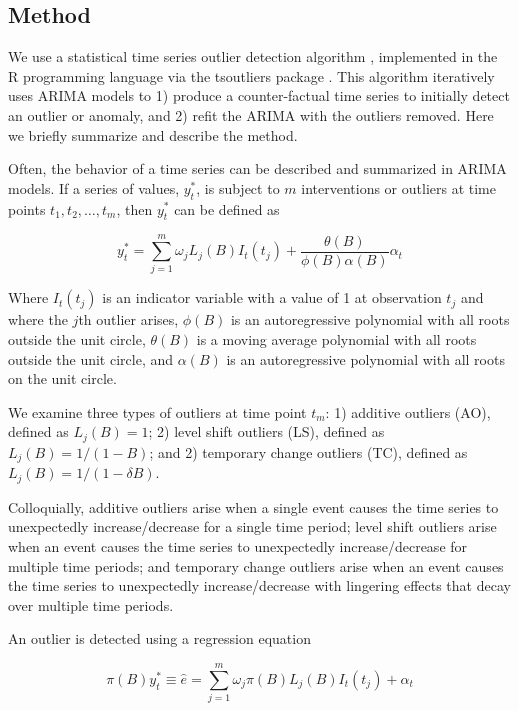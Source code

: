 \documentclass[12pt]{article}
\begin{document}
\hypertarget{method}{%
\subsection{Method}\label{method}}

We use a statistical time series outlier detection algorithm
\citep{chen1993joint}, implemented in the R programming language
\citep{rcore} via the tsoutliers package \citep{tsoutliers2019}. This
algorithm iteratively uses ARIMA models to 1) produce a counter-factual
time series to initially detect an outlier or anomaly, and 2) refit the
ARIMA with the outliers removed. Here we briefly summarize and describe
the method.

Often, the behavior of a time series can be described and summarized in
ARIMA models. If a series of values, \(y_t^*\), is subject to \(m\)
interventions or outliers at time points \(t_1,t_2,…,t_m\), then
\(y_t^*\) can be defined as

\[y_t^* = \sum_{j=1}^{m} \omega_jL_j(B)I_t(t_j) + \frac{\theta(B)}{\phi(B)\alpha(B)}\alpha_t\]

Where \(I_t(t_j)\) is an indicator variable with a value of 1 at
observation \(t_j\) and where the \(j\)th outlier arises, \(\phi(B)\) is
an autoregressive polynomial with all roots outside the unit circle,
\(\theta(B)\) is a moving average polynomial with all roots outside the
unit circle, and \(\alpha(B)\) is an autoregressive polynomial with all
roots on the unit circle.

We examine three types of outliers at time point \(t_m\): 1) additive
outliers (AO), defined as \(L_j(B)=1\); 2) level shift outliers (LS),
defined as \(L_j(B) = 1/(1-B)\); and 2) temporary change outliers (TC),
defined as \(L_j(B) = 1/(1-\delta B)\).

Colloquially, additive outliers arise when a single event causes the
time series to unexpectedly increase/decrease for a single time period;
level shift outliers arise when an event causes the time series to
unexpectedly increase/decrease for multiple time periods; and temporary
change outliers arise when an event causes the time series to
unexpectedly increase/decrease with lingering effects that decay over
multiple time periods.

An outlier is detected using a regression equation

\[ \pi(B)y_t^* \equiv \hat{e} = \sum_{j=1}^m \omega_j \pi(B)L_j(B)I_t(t_j) + \alpha_t \]
\end{document}
